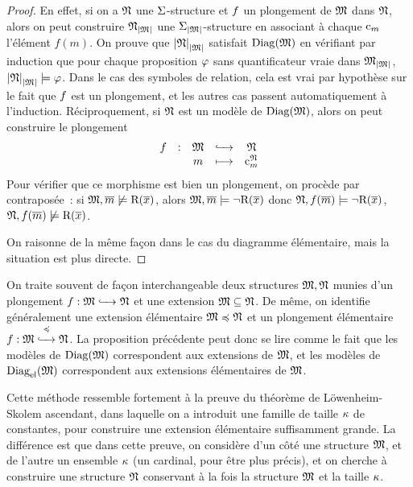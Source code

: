 \begin{proof}
  En effet, si on a $\mathfrak{N}$ une $\Sigma$-structure et $f$ un plongement
  de $\mathfrak{M}$ dans $\mathfrak{N}$, alors on peut construire $\mathfrak{N}_{\left\vert \mathfrak{M}\right\vert}$ une
  $\Sigma_{\left\vert \mathfrak{M}\right\vert}$-structure en associant à chaque $\mathrm{c}_m$ l'élément
  $f(m)$. On prouve que $\left\vert \mathfrak{N}\right\vert_{\left\vert \mathfrak{M}\right\vert}$ satisfait $\operatorname{Diag}(\mathfrak{M})$ en vérifiant
  par induction que pour chaque proposition $\varphi$ sans quantificateur vraie
  dans $\mathfrak{M}_{\left\vert \mathfrak{M}\right\vert}$, $\left\vert \mathfrak{N}\right\vert_{\left\vert \mathfrak{M}\right\vert}\models\varphi$. Dans le cas des
  symboles de relation, cela est vrai par hypothèse sur le fait que
  $f$ est un plongement, et les autres cas passent automatiquement à
  l'induction. Réciproquement, si $\mathfrak{N}$ est un modèle de $\operatorname{Diag}(\mathfrak{M})$,
  alors on peut construire le plongement
  \[\makeEmbed{\varMoM}{\varMM}{\varMN}{m}{\toMP{\Cc_m}{\varMN}}\]
  Pour vérifier que ce morphisme est bien un plongement, on procède par
  contraposée~: si $\mathfrak{M},\overline{m}\not\models\mathrm{R}(\overline{x})$, alors
  $\mathfrak{M},\overline{m}\models\lnot\mathrm{R}(\overline{x})$ donc
  $\mathfrak{N},f(\overline{m})\models\lnot\mathrm{R}(\overline{x})$, 
  $\mathfrak{N},f(\overline{m})\not\models\mathrm{R}(\overline{x})$.

  On raisonne de la même façon dans le cas du diagramme élémentaire, mais
  la situation est plus directe.
\end{proof}

\begin{remark}
  On traite souvent de façon interchangeable deux structures $\mathfrak{M},\mathfrak{N}$
  munies d'un plongement $f : \displaystyle \mathfrak{M} \xhookrightarrow{\quad} \mathfrak{N}$ et une
  extension $\mathfrak{M}\subseteq\mathfrak{N}$. De même, on identifie généralement
  une extension élémentaire $\mathfrak{M}\preccurlyeq\mathfrak{N}$ et un plongement
  élémentaire $f : \displaystyle \mathfrak{M} \overset{\preccurlyeq}{\xhookrightarrow{\quad}} \mathfrak{N}$. La proposition
  précédente peut donc se lire comme le fait que les modèles de $\operatorname{Diag}(\mathfrak{M})$
  correspondent aux extensions de $\mathfrak{M}$, et les modèles de $\operatorname{Diag}_{\mathrm{el}}(\mathfrak{M})$
  correspondent aux extensions élémentaires de $\mathfrak{M}$.
\end{remark}

Cette méthode ressemble fortement à la preuve du théorème de Löwenheim-Skolem
ascendant, dans laquelle on a introduit une famille de taille $\kappa$ de
constantes, pour construire une extension élémentaire suffisamment grande.
La différence est que dans cette preuve, on considère d'un côté une structure
$\mathfrak{M}$, et de l'autre un ensemble $\kappa$ (un cardinal, pour être plus
précis), et on cherche à construire une structure $\mathfrak{N}$ conservant à la fois
la structure $\mathfrak{M}$ et la taille $\kappa$.

